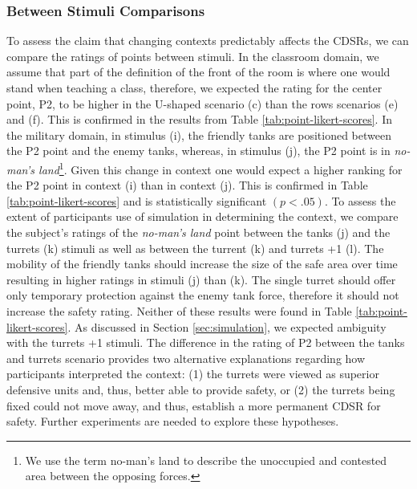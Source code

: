 \documentclass[11pt,letterpaper]{article}
\begin{document}
\subsubsection{Between Stimuli Comparisons}

To assess the claim that changing contexts predictably affects the CDSRs, we can compare the ratings of points between stimuli.  In the classroom domain, we assume that part of the definition of the front of the room is where one would stand when teaching a class, therefore, we expected the rating for the center point, P2, to be higher in the U-shaped scenario (c) than the rows scenarios (e) and (f).  This is confirmed in the results from Table \ref{tab:point-likert-scores}.  In the military domain, in stimulus (i), the friendly tanks are positioned between the P2 point and the enemy tanks, whereas, in stimulus (j), the P2 point is in \textit{no-man's land}\footnote{We use the term no-man's land to describe the unoccupied and contested area between the opposing forces.}.  Given this change in context one would expect a higher ranking for the P2 point in context (i) than in context (j). This is confirmed in Table \ref{tab:point-likert-scores} and is statistically significant $(p<.05)$.  To assess the extent of participants use of simulation in determining the context, we compare the subject's ratings of the \textit{no-man's land} point between the tanks (j) and the turrets (k) stimuli as well as between the turrent (k) and turrets +1 (l).  The mobility of the friendly tanks should increase the size of the safe area over time resulting in higher ratings in stimuli (j) than (k).  The single turret should offer only temporary protection against the enemy tank force, therefore it should not increase the safety rating.  Neither of these results were found in Table \ref{tab:point-likert-scores}.  As discussed in Section \ref{sec:simulation}, we expected ambiguity with the turrets +1 stimuli.  The difference in the rating of P2 between the tanks and turrets scenario provides two alternative explanations regarding how participants interpreted the context:  (1) the turrets were viewed as superior defensive units and, thus, better able to provide safety, or (2) the turrets being fixed could not move away, and thus, establish a more permanent CDSR for safety.  Further experiments are needed to explore these hypotheses. 
\end{document}
